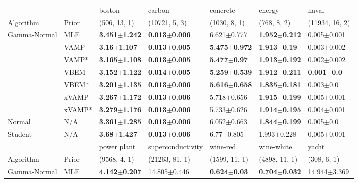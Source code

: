 \begin{tabular}{lllllll}
\toprule
        &     &                    boston &                    carbon &                  concrete &                    energy &                   naval \\
Algorithm & Prior& (506, 13, 1)& (10721, 5, 3)& (1030, 8, 1)& (768, 8, 2)& (11934, 16, 2)\\
\midrule
Gamma-Normal & MLE &  \textbf{3.451$\pm$1.242} &  \textbf{0.013$\pm$0.006} &           6.621$\pm$0.777 &  \textbf{1.952$\pm$0.212} &         0.005$\pm$0.001 \\
        & VAMP &   \textbf{3.16$\pm$1.107} &  \textbf{0.013$\pm$0.005} &  \textbf{5.475$\pm$0.972} &   \textbf{1.913$\pm$0.19} &         0.003$\pm$0.002 \\
        & VAMP* &  \textbf{3.165$\pm$1.108} &  \textbf{0.013$\pm$0.005} &   \textbf{5.477$\pm$0.97} &  \textbf{1.913$\pm$0.192} &         0.002$\pm$0.002 \\
        & VBEM &  \textbf{3.152$\pm$1.122} &  \textbf{0.014$\pm$0.005} &  \textbf{5.259$\pm$0.539} &  \textbf{1.912$\pm$0.211} &  \textbf{0.001$\pm$0.0} \\
        & VBEM* &  \textbf{3.201$\pm$1.135} &  \textbf{0.013$\pm$0.006} &  \textbf{5.616$\pm$0.658} &  \textbf{1.835$\pm$0.181} &           0.003$\pm$0.0 \\
        & xVAMP &  \textbf{3.267$\pm$1.172} &  \textbf{0.013$\pm$0.006} &           5.718$\pm$0.656 &  \textbf{1.915$\pm$0.199} &         0.005$\pm$0.001 \\
        & xVAMP* &  \textbf{3.279$\pm$1.176} &  \textbf{0.013$\pm$0.006} &           5.733$\pm$0.626 &  \textbf{1.914$\pm$0.195} &         0.004$\pm$0.001 \\
Normal & N/A &  \textbf{3.361$\pm$1.285} &  \textbf{0.013$\pm$0.006} &           6.052$\pm$0.663 &  \textbf{1.844$\pm$0.199} &           0.005$\pm$0.0 \\
Student & N/A &   \textbf{3.68$\pm$1.427} &  \textbf{0.013$\pm$0.006} &            6.77$\pm$0.805 &           1.993$\pm$0.228 &         0.005$\pm$0.001 \\
\midrule
        &     &               power plant &          superconductivity &                  wine-red &                wine-white &                     yacht \\
Algorithm & Prior& (9568, 4, 1)& (21263, 81, 1)& (1599, 11, 1)& (4898, 11, 1)& (308, 6, 1)\\
\midrule
Gamma-Normal & MLE &  \textbf{4.142$\pm$0.207} &           14.805$\pm$0.446 &   \textbf{0.624$\pm$0.03} &  \textbf{0.704$\pm$0.032} &          14.944$\pm$3.369 \\

\end{tabular}
